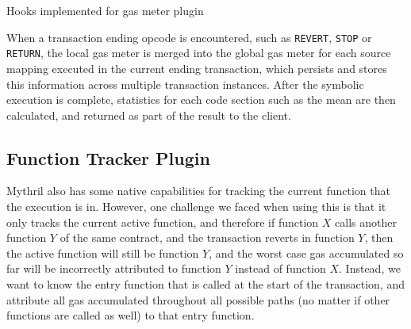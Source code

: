 \begin{algorithm}[H]
  \DontPrintSemicolon
    
    
      \;

  \caption{Hooks implemented for gas meter plugin}
  \label{lst:gas_meter_hooks}
\end{algorithm}

When a transaction ending opcode is encountered, such as \texttt{REVERT}, \texttt{STOP} or \texttt{RETURN},
the local gas meter is merged into the global gas meter for each source mapping executed in the 
current ending transaction, which persists and stores this information across multiple transaction 
instances. After the symbolic execution is complete, statistics for each code section such as the mean are 
then calculated, and returned as part of the result to the client.


\subsection{Function Tracker Plugin}

Mythril also has some native capabilities for tracking the current function that the execution is in.
However, one challenge we faced when using this is that 
it only tracks the current active function, and therefore if function $X$ calls another
function $Y$ of the same contract, and the transaction reverts in function $Y$, then the active function
will still be function $Y$, and the worst case gas accumulated so far will be incorrectly attributed
to function $Y$ instead of function $X$. Instead, we want to know the entry function that is called
at the start of the transaction, and attribute all gas accumulated throughout all possible paths (no matter
if other functions are called as well) to that entry function.


